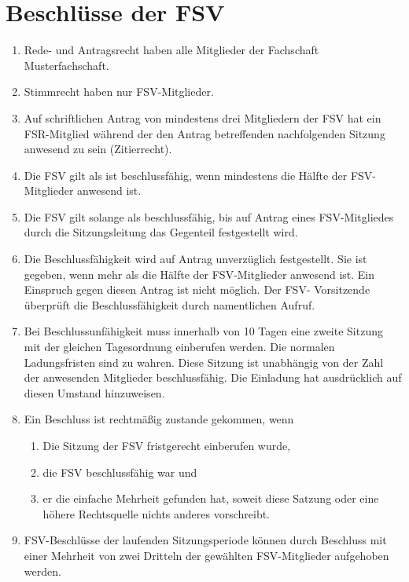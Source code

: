 \documentclass{article}
\newcommand{\fachschaft}{Musterfachschaft}
\begin{document}
\section{Beschlüsse der FSV}
\begin{enumerate}[(1)]
    \item Rede- und Antragsrecht haben alle Mitglieder der Fachschaft \fachschaft.
    \item Stimmrecht haben nur FSV-Mitglieder.
    \item Auf schriftlichen Antrag von mindestens drei Mitgliedern der FSV hat ein FSR-Mitglied während der den Antrag betreffenden nachfolgenden Sitzung anwesend zu sein (Zitierrecht).
    \item Die FSV gilt als ist beschlussfähig, wenn mindestens die Hälfte der FSV-Mitglieder anwesend ist.
    \item Die FSV gilt solange als beschlussfähig, bis auf Antrag eines FSV-Mitgliedes durch die Sitzungsleitung das Gegenteil festgestellt wird.
	\item Die Beschlussfähigkeit wird auf Antrag unverzüglich festgestellt. Sie ist gegeben, wenn mehr als die Hälfte der FSV-Mitglieder anwesend ist. Ein Einspruch gegen diesen Antrag ist nicht möglich. Der FSV- Vorsitzende überprüft die Beschlussfähigkeit durch namentlichen Aufruf.
	\item Bei Beschlussunfähigkeit muss innerhalb von 10 Tagen eine zweite Sitzung mit der gleichen Tagesordnung einberufen werden. Die normalen Ladungsfristen sind zu wahren. Diese Sitzung ist unabhängig von der Zahl der anwesenden Mitglieder beschlussfähig. Die Einladung hat ausdrücklich auf diesen Umstand hinzuweisen.
	\item Ein Beschluss ist rechtmäßig zustande gekommen, wenn
	\begin{enumerate}[1.]
		\item Die Sitzung der FSV fristgerecht einberufen wurde,
		\item die FSV beschlussfähig war und
		\item er die einfache Mehrheit gefunden hat, soweit diese Satzung oder eine höhere Rechtsquelle nichts anderes vorschreibt.
	\end{enumerate}
	\item FSV-Beschlüsse der laufenden Sitzungsperiode können durch Beschluss mit einer Mehrheit von zwei Dritteln der gewählten FSV-Mitglieder aufgehoben werden.
\end{enumerate}
\end{document}
